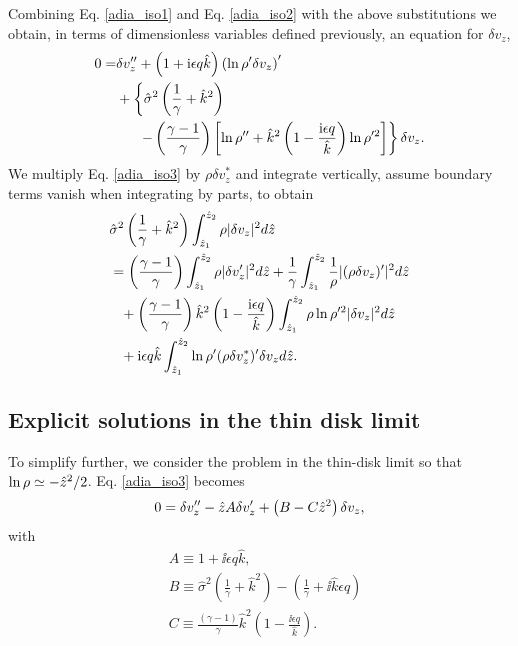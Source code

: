 Combining Eq. \ref{adia_iso1} and Eq. \ref{adia_iso2} with the above
substitutions we obtain, in terms of dimensionless variables defined previously, an equation for $\delta v_z$,
\begin{align}
  0 =& \delta v_z^{\prime\prime} + \left(1 + \mathrm{i} \epsilon q
    \hat{k}\right)\left(\ln\rho^{\prime}\delta v_z\right)^\prime\notag\\
  &+\left\{\hat{\sigma}^2\left(\frac{1}{\gamma}+\hat{k}^2\right)\right.\notag\\
  &\phantom{0=}\left.-\left(\frac{\gamma-1}{\gamma}\right)\left[\ln\rho^{\prime\prime}+\hat{k}^2\left(1-\frac{\mathrm{i}\epsilon
          q}{\hat{k}}\right)\ln\rho^{\prime 2}\right]\right\}\delta v_z.\label{adia_iso3}
\end{align}
We multiply Eq. \ref{adia_iso3} by $\rho\delta v_z^*$ and
integrate vertically, assume boundary terms vanish when integrating by
parts, to obtain
\begin{align}
  &\hat{\sigma}^2\left(\frac{1}{\gamma} +
    \hat{k}^2\right)\int_{\hat{z}_1}^{\hat{z}_2}\rho|\delta
  v_z|^2 d\hat{z} \notag\\
  &=  \left(\frac{\gamma-1}{\gamma}\right)
  \int_{\hat{z}_1}^{\hat{z}_2}\rho|\delta v_z^\prime|^2 d\hat{z}
  +\frac{1}{\gamma}\int_{\hat{z}_1}^{\hat{z}_2}\frac{1}{\rho}|(\rho\delta
  v_z)^\prime|^2 d\hat{z}\notag\\
  &\phantom{=} +
  \left(\frac{\gamma-1}{\gamma}\right)\hat{k}^2\left(1-\frac{\mathrm{i}\epsilon
      q}{\hat{k}}\right) \int_{\hat{z}_1}^{\hat{z}_2}\rho\ln\rho^{\prime
    2}|\delta v_z|^2 d\hat{z}\notag\\
  &\phantom{=} + \mathrm{i}\epsilon q \hat{k}
  \int_{\hat{z}_1}^{\hat{z}_2}\ln\rho^\prime(\rho\delta v_z^*)^\prime
  \delta v_z d\hat{z}.
\end{align}

\subsection{Explicit solutions in the thin disk limit}
To simplify further, we consider the problem in the thin-disk limit so
that $\ln \rho \simeq -\hat{z}^2/2$. Eq. \ref{adia_iso3} becomes 
\begin{align}
  0 = \delta v_z^{\prime\prime} - \hat{z} A \delta v_z^\prime + \left(B
    - C \hat{z}^2\right)\delta v_z,
\end{align}
with
\begin{align}
  &A \equiv 1 + \ii \epsilon q \hat{k},\\
  &B \equiv \hat{\sigma}^2\left(\frac{1}{\gamma} + \hat{k}^2\right) -
  \left(\frac{1}{\gamma} + \ii \hat{k} \epsilon q\right)\\
  &C \equiv \frac{\left(\gamma-1\right)}{\gamma}\hat{k}^2\left(1 - \frac{\ii
      \epsilon q}{\hat{k}}\right).
\end{align}



